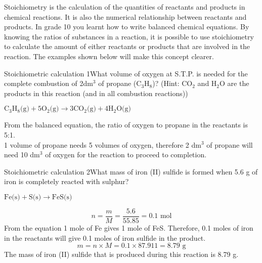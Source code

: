 Stoichiometry is the calculation of the quantities of reactants and products in chemical reactions. It is also the numerical relationship between reactants and products. In grade 10 you learnt how to write balanced chemical equations. By knowing the ratios of substances in a reaction, it is possible to use stoichiometry to calculate the amount of either reactants or products that are involved in the reaction. The examples shown below will make this concept clearer.
\begin{wex}{Stoichiometric calculation 1}{What volume of oxygen at S.T.P. is needed for the complete combustion of 2dm$^{3}$ of propane (C$_{3}$H$_{8}$)? (Hint: CO$_{2}$ and H$_{2}$O are the products in this reaction (and in all combustion reactions))\\}

{
\begin{center}
$\text{C}_{3}\text{H}_{8}\text{(g)} + 5\text{O}_{2}\text{(g)} \rightarrow 3\text{CO}_{2}\text{(g)} + 4\text{H}_{2}\text{O(g)}$\\
\end{center}


From the balanced equation, the ratio of oxygen to propane in the reactants is 5:1. \\

1 volume of propane needs 5 volumes of oxygen, therefore 2 dm$^{3}$ of propane will need 10 dm$^{3}$ of oxygen for the reaction to proceed to completion.}
\end{wex}

\begin{wex}{Stoichiometric calculation 2}{What mass of iron (II) sulfide is formed when 5.6 g of iron is completely reacted with sulphur?\\}
{
\begin{center}
$\text{Fe(s)} + \text{S(s)} \rightarrow \text{FeS(s)}$
\end{center}

\begin{equation*}
n = \frac{m}{M} = \frac{5.6}{55.85} = 0.1 \text{ mol}
\end{equation*}
From the equation 1 mole of Fe gives 1 mole of FeS. Therefore, 0.1 moles of iron in the reactants will give 0.1 moles of iron sulfide in the product.\\
\begin{equation*}
m = n \times M = 0.1 \times 87.911 = 8.79 \text{ g}
\end{equation*}
The mass of iron (II) sulfide that is produced during this reaction is 8.79 g.}
\end{wex}

